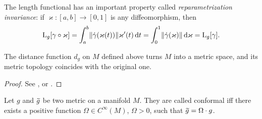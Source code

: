 The length functional has an important property called \emph{reparametrization invariance}: if $\varkappa:[a,b]\to[0,1]$ is any diffeomorphism, then 
\[\mathrm{L}_g[\gamma\circ\varkappa]=\int_a^b  \lVert\dot\gamma(\varkappa(t))\rVert \varkappa' (t)\mathop{}\!\mathrm{d} t=\int_0^1 \lVert\dot\gamma(\varkappa)\rVert \mathop{}\!\mathrm{d} \varkappa = \mathrm{L}_g[\gamma].\]


\begin{thm}
    The distance function $d_g$ on $M$ defined above turns $M$ into a metric space, and its metric topology coincides with the original one.
\end{thm}
\begin{proof}
    See \cite[Thm. 13.29]{Lee}, \cite[Lem. 6.2]{LieRiem} or \cite[Lem. 1.4.1]{Jost}.
\end{proof}


\begin{defn}
    Let $g$ and $\wt{g}$ be two metric on a manifold $M$. They are called conformal iff there exists a positive function $\Omega\in C^\infty(M)$, $\Omega>0$, such that $\wt{g}=\Omega\cdot g$.
\end{defn}

